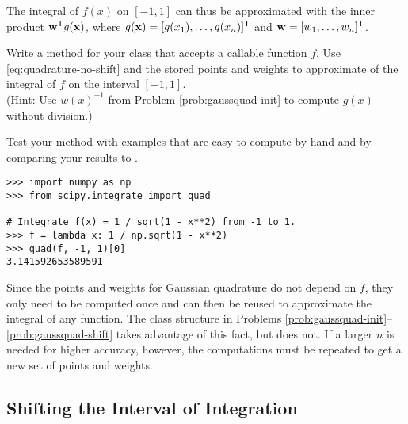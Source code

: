 The integral of $f(x)$ on $[-1,1]$ can thus be approximated with the inner product $\mathbf{w}^{\mathsf T} g(\mathbf{x})$, where $g(\mathbf{x}) = [g(x_1),\dots,g(x_n)]^{\mathsf T}$ and $\mathbf{w} = [w_1,\dots,w_n]^{\mathsf T}$.

\begin{problem} %
Write a method for your class that accepts a callable function $f$.
Use \eqref{eq:quadrature-no-shift} and the stored points and weights to approximate of the integral of $f$ on the interval $[-1,1]$.
\\(Hint: Use $w(x)^{-1}$ from Problem \ref{prob:gaussquad-init} to compute $g(x)$ without division.)

Test your method with examples that are easy to compute by hand and by comparing your results to .
\begin{lstlisting}
>>> import numpy as np
>>> from scipy.integrate import quad

# Integrate f(x) = 1 / sqrt(1 - x**2) from -1 to 1.
>>> f = lambda x: 1 / np.sqrt(1 - x**2)
>>> quad(f, -1, 1)[0]
3.141592653589591
\end{lstlisting}
\label{prob:gaussquad-no-shift}
\end{problem}

\begin{info}
Since the points and weights for Gaussian quadrature do not depend on $f$, they only need to be computed once and can then be reused to approximate the integral of any function.
The class structure in Problems \ref{prob:gaussquad-init}--\ref{prob:gaussquad-shift} takes advantage of this fact, but  does not.
If a larger $n$ is needed for higher accuracy, however, the computations must be repeated to get a new set of points and weights.
\end{info}

\subsection*{Shifting the Interval of Integration} %

